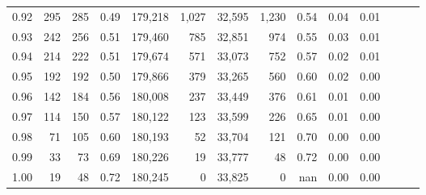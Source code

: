 \begin{tabular}{rrrrrrrrrrrrrr}
0.92 &    295 &  285 &  0.49 &  179,218 &    1,027 &  32,595 &   1,230 &  0.54 &  0.04 &      0.01 \\
0.93 &    242 &  256 &  0.51 &  179,460 &      785 &  32,851 &     974 &  0.55 &  0.03 &      0.01 \\
0.94 &    214 &  222 &  0.51 &  179,674 &      571 &  33,073 &     752 &  0.57 &  0.02 &      0.01 \\
0.95 &    192 &  192 &  0.50 &  179,866 &      379 &  33,265 &     560 &  0.60 &  0.02 &      0.00 \\
0.96 &    142 &  184 &  0.56 &  180,008 &      237 &  33,449 &     376 &  0.61 &  0.01 &      0.00 \\
0.97 &    114 &  150 &  0.57 &  180,122 &      123 &  33,599 &     226 &  0.65 &  0.01 &      0.00 \\
0.98 &     71 &  105 &  0.60 &  180,193 &       52 &  33,704 &     121 &  0.70 &  0.00 &      0.00 \\
0.99 &     33 &   73 &  0.69 &  180,226 &       19 &  33,777 &      48 &  0.72 &  0.00 &      0.00 \\
1.00 &     19 &   48 &  0.72 &  180,245 &        0 &  33,825 &       0 &   nan &  0.00 &      0.00 \\
\bottomrule
\end{tabular}
